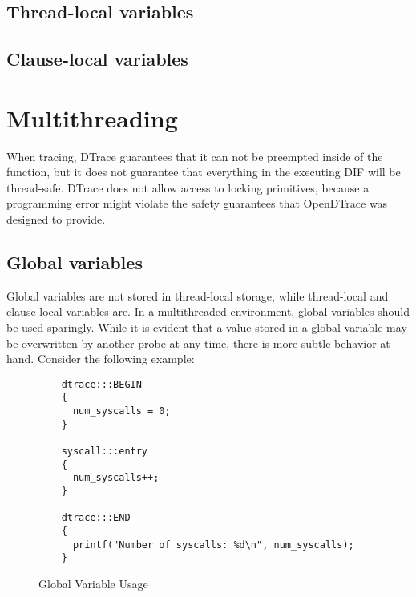 \subsection{Thread-local variables}
\label{subsec:thread-local-variables}

\subsection{Clause-local variables}

\section{Multithreading}


When tracing, DTrace guarantees that it can not be preempted inside of
the  function, but it does not guarantee that
everything in the executing DIF will be thread-safe. DTrace does not
allow access to locking primitives, because a programming error might
violate the safety guarantees that OpenDTrace was designed to provide.

\subsection{Global variables}

Global variables are not stored in thread-local storage, while
thread-local and clause-local variables are. In a multithreaded
environment, global variables should be used sparingly. While it is
evident that a value stored in a global variable may be overwritten by
another probe at any time, there is more subtle behavior at
hand. Consider the following example:

\begin{figure}
  \begin{lstlisting}
    dtrace:::BEGIN
    {
      num_syscalls = 0;
    }
    
    syscall:::entry
    {
      num_syscalls++;
    }
    
    dtrace:::END
    {
      printf("Number of syscalls: %d\n", num_syscalls);
    }
  \end{lstlisting}
  \caption{Global Variable Usage}
  \label{fig:global-var-usage}
\end{figure}

